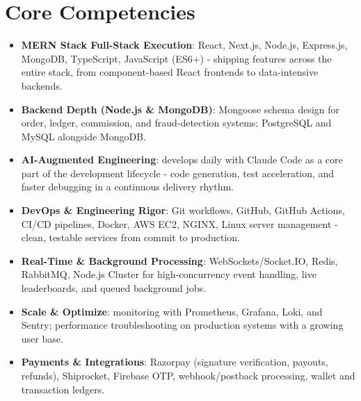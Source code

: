 \documentclass[11pt,a4paper,sans]{moderncv}
\begin{document}
\section{Core Competencies}
\vspace{1pt}
\begin{itemize}

\item \textbf{MERN Stack Full-Stack Execution}: React, Next.js, Node.js, Express.js, MongoDB, TypeScript, JavaScript (ES6+) - shipping features across the entire stack, from component-based React frontends to data-intensive backends.

\item \textbf{Backend Depth (Node.js \& MongoDB)}: Mongoose schema design for order, ledger, commission, and fraud-detection systems; PostgreSQL and MySQL alongside MongoDB.

\item \textbf{AI-Augmented Engineering}: develops daily with Claude Code as a core part of the development lifecycle - code generation, test acceleration, and faster debugging in a continuous delivery rhythm.

\item \textbf{DevOps \& Engineering Rigor}: Git workflows, GitHub, GitHub Actions, CI/CD pipelines, Docker, AWS EC2, NGINX, Linux server management - clean, testable services from commit to production.

\item \textbf{Real-Time \& Background Processing}: WebSockets/Socket.IO, Redis, RabbitMQ, Node.js Cluster for high-concurrency event handling, live leaderboards, and queued background jobs.

\item \textbf{Scale \& Optimize}: monitoring with Prometheus, Grafana, Loki, and Sentry; performance troubleshooting on production systems with a growing user base.

\item \textbf{Payments \& Integrations}: Razorpay (signature verification, payouts, refunds), Shiprocket, Firebase OTP, webhook/postback processing, wallet and transaction ledgers.

\end{itemize}

\end{document}
